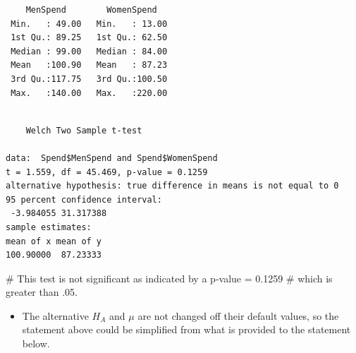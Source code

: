 \documentclass[
  letterpaper,
  DIV=11,
  numbers=noendperiod]{scrreprt}
\newenvironment{Shaded}{\begin{snugshade}}{\end{snugshade}}
\newcommand{\AttributeTok}[1]{\textcolor[rgb]{0.40,0.45,0.13}{#1}}
\newcommand{\CommentTok}[1]{\textcolor[rgb]{0.37,0.37,0.37}{#1}}
\newcommand{\DecValTok}[1]{\textcolor[rgb]{0.68,0.00,0.00}{#1}}
\newcommand{\FunctionTok}[1]{\textcolor[rgb]{0.28,0.35,0.67}{#1}}
\newcommand{\NormalTok}[1]{\textcolor[rgb]{0.00,0.23,0.31}{#1}}
\newcommand{\SpecialCharTok}[1]{\textcolor[rgb]{0.37,0.37,0.37}{#1}}
\newcommand{\StringTok}[1]{\textcolor[rgb]{0.13,0.47,0.30}{#1}}
\providecommand{\tightlist}{%
  \setlength{\itemsep}{0pt}\setlength{\parskip}{0pt}}\usepackage{longtable,booktabs,array}
\begin{document}
\begin{verbatim}
    MenSpend        WomenSpend    
 Min.   : 49.00   Min.   : 13.00  
 1st Qu.: 89.25   1st Qu.: 62.50  
 Median : 99.00   Median : 84.00  
 Mean   :100.90   Mean   : 87.23  
 3rd Qu.:117.75   3rd Qu.:100.50  
 Max.   :140.00   Max.   :220.00  
\end{verbatim}

\begin{Shaded}
\end{Shaded}

\begin{verbatim}

    Welch Two Sample t-test

data:  Spend$MenSpend and Spend$WomenSpend
t = 1.559, df = 45.469, p-value = 0.1259
alternative hypothesis: true difference in means is not equal to 0
95 percent confidence interval:
 -3.984055 31.317388
sample estimates:
mean of x mean of y 
100.90000  87.23333 
\end{verbatim}

\begin{Shaded}
\begin{Highlighting}[]
\CommentTok{\# This test is not significant as indicated by a p{-}value = 0.1259}
\CommentTok{\# which is greater than .05.}
\end{Highlighting}
\end{Shaded}

\begin{itemize}
\tightlist
\item
  The alternative \(H_A\) and \(\mu\) are not changed off their default
  values, so the statement above could be simplified from what is
  provided to the statement below.
\end{itemize}

\begin{Shaded}
\end{Shaded}
\end{document}
